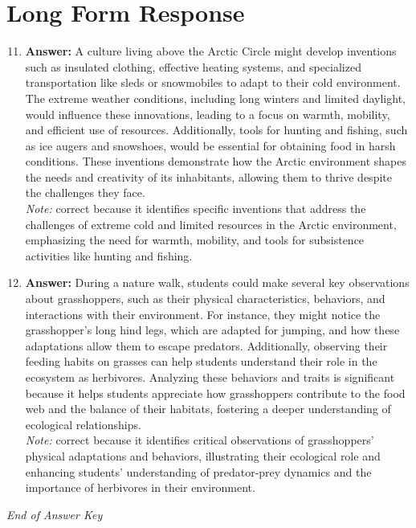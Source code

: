 \documentclass[12pt]{article}
\begin{document}
\section*{Long Form Response}
\begin{enumerate}[label=\arabic*.]
\setcounter{enumi}{10}
\item \textbf{Answer:} A culture living above the Arctic Circle might develop inventions such as insulated clothing, effective heating systems, and specialized transportation like sleds or snowmobiles to adapt to their cold environment. The extreme weather conditions, including long winters and limited daylight, would influence these innovations, leading to a focus on warmth, mobility, and efficient use of resources. Additionally, tools for hunting and fishing, such as ice augers and snowshoes, would be essential for obtaining food in harsh conditions. These inventions demonstrate how the Arctic environment shapes the needs and creativity of its inhabitants, allowing them to thrive despite the challenges they face.
\\ \textit{Note:} correct because it identifies specific inventions that address the challenges of extreme cold and limited resources in the Arctic environment, emphasizing the need for warmth, mobility, and tools for subsistence activities like hunting and fishing.
\item \textbf{Answer:} During a nature walk, students could make several key observations about grasshoppers, such as their physical characteristics, behaviors, and interactions with their environment. For instance, they might notice the grasshopper's long hind legs, which are adapted for jumping, and how these adaptations allow them to escape predators. Additionally, observing their feeding habits on grasses can help students understand their role in the ecosystem as herbivores. Analyzing these behaviors and traits is significant because it helps students appreciate how grasshoppers contribute to the food web and the balance of their habitats, fostering a deeper understanding of ecological relationships.
\\ \textit{Note:} correct because it identifies critical observations of grasshoppers' physical adaptations and behaviors, illustrating their ecological role and enhancing students' understanding of predator-prey dynamics and the importance of herbivores in their environment.
\end{enumerate}

\vfill
\noindent\textit{End of Answer Key}
\end{document}
